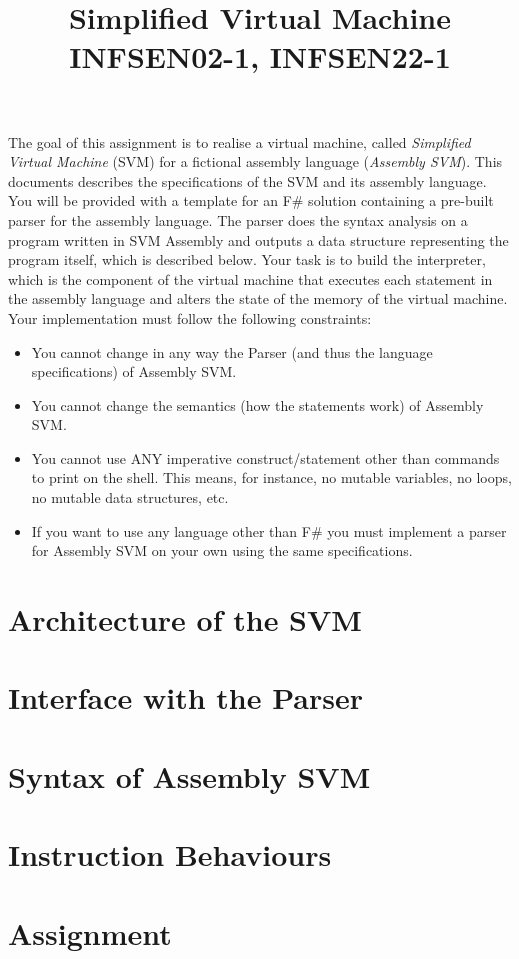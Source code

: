 \documentclass[a4paper]{article}
\title {Simplified Virtual Machine\\ INFSEN02-1, INFSEN22-1}
\author{ }
\date { }
\begin{document}
\maketitle

The goal of this assignment is to realise a virtual machine, called \textit{Simplified Virtual Machine} (SVM) for a fictional assembly language (\textit{Assembly SVM}). This documents describes the specifications of the SVM and its assembly language. You will be provided with a template for an F\# solution containing a pre-built parser for the assembly language. The parser does the syntax analysis on a program written in SVM Assembly and outputs a data structure representing the program itself, which is described below. Your task is to build the interpreter, which is the component of the virtual machine that executes each statement in the assembly language and alters the state of the memory of the virtual machine. Your implementation must follow the following constraints:

\begin{itemize}
	\item You cannot change in any way the Parser (and thus the language specifications) of Assembly SVM.
	\item You cannot change the semantics (how the statements work) of Assembly SVM.
	\item You cannot use ANY imperative construct/statement other than commands to print on the shell. This means, for instance, no mutable variables, no loops, no mutable data structures, etc.
	\item If you want to use any language other than F\# you must implement a parser for Assembly SVM on your own using the same specifications.
\end{itemize}

\section{Architecture of the SVM}


\section{Interface with the Parser}


\section{Syntax of Assembly SVM}


\section{Instruction Behaviours}


\section{Assignment}

\end{document}
